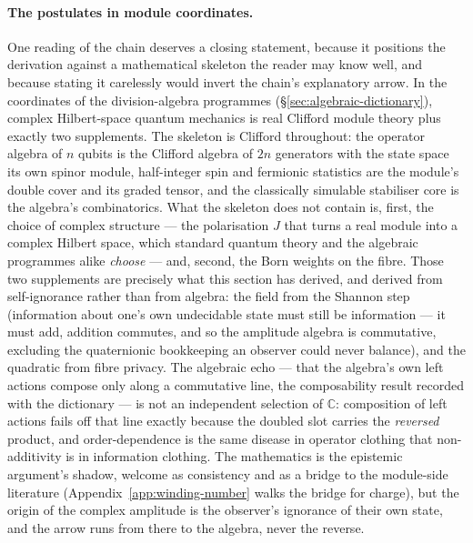 \paragraph{The postulates in module coordinates.}
One reading of the chain deserves a closing statement, because it positions the derivation
against a mathematical skeleton the reader may know well, and because stating it carelessly would
invert the chain's explanatory arrow. In the coordinates of the division-algebra programmes
(\S\ref{sec:algebraic-dictionary}), complex Hilbert-space quantum mechanics is real Clifford
module theory plus exactly two supplements. The skeleton is Clifford throughout: the operator
algebra of $n$ qubits is the Clifford algebra of $2n$ generators with the state space its own
spinor module, half-integer spin and fermionic statistics are the module's double cover and its
graded tensor, and the classically simulable stabiliser core is the algebra's combinatorics. What
the skeleton does not contain is, first, the choice of complex structure --- the polarisation $J$
that turns a real module into a complex Hilbert space, which standard quantum theory and the
algebraic programmes alike \emph{choose} --- and, second, the Born weights on the fibre. Those two
supplements are precisely what this section has derived, and derived from self-ignorance rather
than from algebra: the field from the Shannon step (information about one's own undecidable state
must still be information --- it must add, addition commutes, and so the amplitude algebra is
commutative, excluding the quaternionic bookkeeping an observer could never balance), and the
quadratic from fibre privacy. The algebraic echo --- that the algebra's own left actions compose
only along a commutative line, the composability result recorded with the dictionary --- is not
an independent selection of $\mathbb{C}$: composition of left actions fails off that line exactly
because the doubled slot carries the \emph{reversed} product, and order-dependence is the same
disease in operator clothing that non-additivity is in information clothing. The mathematics is
the epistemic argument's shadow, welcome as consistency and as a bridge to the module-side
literature (Appendix~\ref{app:winding-number} walks the bridge for charge), but the origin of the
complex amplitude is the observer's ignorance of their own state, and the arrow runs from there
to the algebra, never the reverse.